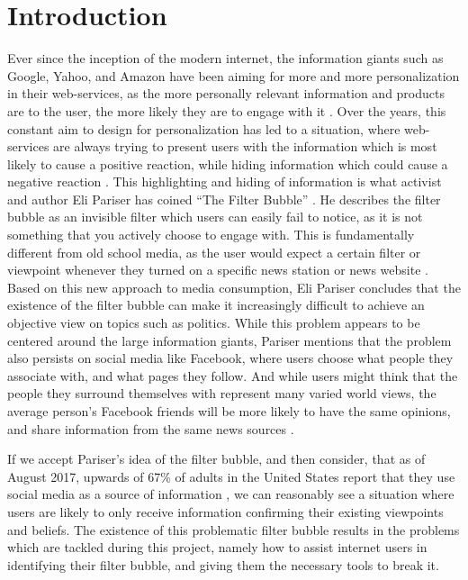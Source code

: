 \chapter{Introduction}\label{ch:intro}

Ever since the inception of the modern internet, the information giants such as
Google, Yahoo, and Amazon have been aiming for more and more personalization in
their web-services, as the more personally relevant information and products are
to the user, the more likely they are to engage with it 
\citep[p.8]{pariser2011filter}. Over the years, this constant aim to design for
personalization has led to a situation, where web-services are always trying to
present users with the information which is most likely to cause a positive
reaction, while hiding information which could cause a negative
reaction \citep{filterBubbleDef, Personality}. This highlighting and hiding of
information is what activist and author Eli Pariser has coined ``The Filter
Bubble'' \citep[p.9]{pariser2011filter}. He describes the filter bubble as an
invisible filter which users can easily fail to notice, as it is not something
that you actively choose to engage with. This is fundamentally different from
old school media, as the user would expect a certain filter or viewpoint
whenever they turned on a specific news station or news website
\citep[p.10]{pariser2011filter}. Based on this new approach to media
consumption, Eli Pariser concludes that the existence of the filter bubble can
make it increasingly difficult to achieve an objective view on topics such as
politics. While this problem appears to be centered around the large information
giants, Pariser mentions that the problem also persists on social media
like Facebook, where users choose what people they associate with, and what
pages they follow. And while users might think that the people they surround
themselves with represent many varied world views, the average person's Facebook
friends will be more likely to have the same opinions, and share
information from the same news sources \citep[p.66]{pariser2011filter}.\nl

If we accept Pariser's idea of the filter bubble, and then consider, that as of
August 2017, upwards of 67\% of adults in the United States report that they use
social media as a source of information \citep{journalism2017}, we can
reasonably see a situation where users are likely to only receive information confirming
their existing viewpoints and beliefs. The existence of this problematic filter
bubble results in the problems which are tackled during this project, namely
how to assist internet users in identifying their filter bubble, and giving them
the necessary tools to break it.


